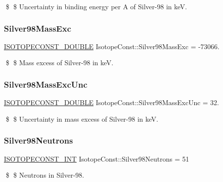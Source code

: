 \$ \$ Uncertainty in binding energy per A of Silver-\/98 in keV. \mbox{\label{group___isotope_const-_silver-_ag98_ga9adf288e885f399492f6dcb3cf59a475}} 
\subsubsection{\texorpdfstring{Silver98\+Mass\+Exc}{Silver98MassExc}}
{\footnotesize\ttfamily \mbox{\hyperlink{group___isotope_const-_macros_ga8f45a7272ce02c0b4c65c44636ed719a}{I\+S\+O\+T\+O\+P\+E\+C\+O\+N\+S\+T\+\_\+\+D\+O\+U\+B\+LE}} Isotope\+Const\+::\+Silver98\+Mass\+Exc = -\/73066.}

\$ \$ Mass excess of Silver-\/98 in keV. \mbox{\label{group___isotope_const-_silver-_ag98_ga0a34c73598a09d335ce2e3f05669d429}} 
\subsubsection{\texorpdfstring{Silver98\+Mass\+Exc\+Unc}{Silver98MassExcUnc}}
{\footnotesize\ttfamily \mbox{\hyperlink{group___isotope_const-_macros_ga8f45a7272ce02c0b4c65c44636ed719a}{I\+S\+O\+T\+O\+P\+E\+C\+O\+N\+S\+T\+\_\+\+D\+O\+U\+B\+LE}} Isotope\+Const\+::\+Silver98\+Mass\+Exc\+Unc = 32.}

\$ \$ Uncertainty in mass excess of Silver-\/98 in keV. \mbox{\label{group___isotope_const-_silver-_ag98_gaa10d9932ac58594eec739d8275cc7aec}} 
\subsubsection{\texorpdfstring{Silver98\+Neutrons}{Silver98Neutrons}}
{\footnotesize\ttfamily \mbox{\hyperlink{group___isotope_const-_macros_ga5f18360b3e99483a35c32d789e62621c}{I\+S\+O\+T\+O\+P\+E\+C\+O\+N\+S\+T\+\_\+\+I\+NT}} Isotope\+Const\+::\+Silver98\+Neutrons = 51}

\$ \$ Neutrons in Silver-\/98. \mbox{\label{group___isotope_const-_silver-_ag98_ga19dd0cf259587f6010afe59369ed4b7e}} 
